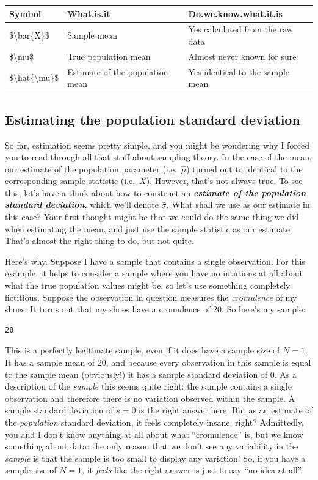 \documentclass[
]{book}
\begin{document}
\begin{tabular}{l|l|l}
\hline
Symbol & What.is.it & Do.we.know.what.it.is\\
\hline
\$\textbackslash{}bar\{X\}\$ & Sample mean & Yes  calculated from the raw data\\
\hline
\$\textbackslash{}mu\$ & True population mean & Almost never known for sure\\
\hline
\$\textbackslash{}hat\{\textbackslash{}mu\}\$ & Estimate of the population mean & Yes  identical to the sample mean\\
\hline
\end{tabular}

\hypertarget{estimating-the-population-standard-deviation}{%
\subsection{Estimating the population standard deviation}\label{estimating-the-population-standard-deviation}}

So far, estimation seems pretty simple, and you might be wondering why I forced you to read through all that stuff about sampling theory. In the case of the mean, our estimate of the population parameter (i.e.~\(\hat\mu\)) turned out to identical to the corresponding sample statistic (i.e.~\(\bar{X}\)). However, that's not always true. To see this, let's have a think about how to construct an \textbf{\emph{estimate of the population standard deviation}}, which we'll denote \(\hat\sigma\). What shall we use as our estimate in this case? Your first thought might be that we could do the same thing we did when estimating the mean, and just use the sample statistic as our estimate. That's almost the right thing to do, but not quite.

Here's why. Suppose I have a sample that contains a single observation. For this example, it helps to consider a sample where you have no intutions at all about what the true population values might be, so let's use something completely fictitious. Suppose the observation in question measures the \emph{cromulence} of my shoes. It turns out that my shoes have a cromulence of 20. So here's my sample:

\begin{verbatim}
20
\end{verbatim}

This is a perfectly legitimate sample, even if it does have a sample size of \(N=1\). It has a sample mean of 20, and because every observation in this sample is equal to the sample mean (obviously!) it has a sample standard deviation of 0. As a description of the \emph{sample} this seems quite right: the sample contains a single observation and therefore there is no variation observed within the sample. A sample standard deviation of \(s = 0\) is the right answer here. But as an estimate of the \emph{population} standard deviation, it feels completely insane, right? Admittedly, you and I don't know anything at all about what ``cromulence'' is, but we know something about data: the only reason that we don't see any variability in the \emph{sample} is that the sample is too small to display any variation! So, if you have a sample size of \(N=1\), it \emph{feels} like the right answer is just to say ``no idea at all''.
\end{document}
